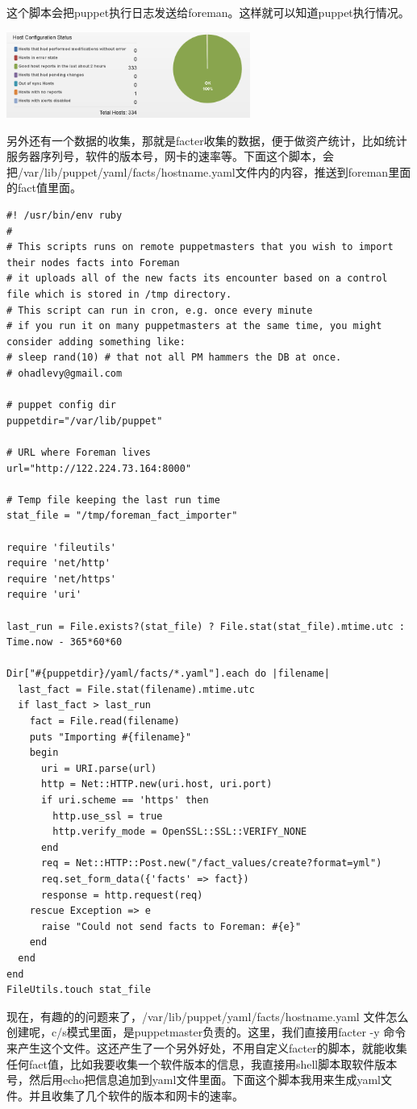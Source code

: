 这个脚本会把puppet执行日志发送给foreman。这样就可以知道puppet执行情况。
\begin{center}
\includegraphics[width=0.6\textwidth]{1.png}
\end{center}
\par
另外还有一个数据的收集，那就是facter收集的数据，便于做资产统计，比如统计服务器序列号，软件的版本号，网卡的速率等。下面这个脚本，会把/var/lib/puppet/yaml/facts/hostname.yaml文件内的内容，推送到foreman里面的fact值里面。
\codefont\tiny \begin{lstlisting}
#! /usr/bin/env ruby
#
# This scripts runs on remote puppetmasters that you wish to import their nodes facts into Foreman
# it uploads all of the new facts its encounter based on a control file which is stored in /tmp directory.
# This script can run in cron, e.g. once every minute
# if you run it on many puppetmasters at the same time, you might consider adding something like:
# sleep rand(10) # that not all PM hammers the DB at once.
# ohadlevy@gmail.com

# puppet config dir
puppetdir="/var/lib/puppet"

# URL where Foreman lives
url="http://122.224.73.164:8000"

# Temp file keeping the last run time
stat_file = "/tmp/foreman_fact_importer"

require 'fileutils'
require 'net/http'
require 'net/https'
require 'uri'

last_run = File.exists?(stat_file) ? File.stat(stat_file).mtime.utc : Time.now - 365*60*60

Dir["#{puppetdir}/yaml/facts/*.yaml"].each do |filename|
  last_fact = File.stat(filename).mtime.utc
  if last_fact > last_run
    fact = File.read(filename)
    puts "Importing #{filename}"
    begin
      uri = URI.parse(url)
      http = Net::HTTP.new(uri.host, uri.port)
      if uri.scheme == 'https' then
        http.use_ssl = true
        http.verify_mode = OpenSSL::SSL::VERIFY_NONE
      end
      req = Net::HTTP::Post.new("/fact_values/create?format=yml")
      req.set_form_data({'facts' => fact})
      response = http.request(req)
    rescue Exception => e
      raise "Could not send facts to Foreman: #{e}"
    end
  end
end
FileUtils.touch stat_file

\end{lstlisting}
\fzsk\normalsize
现在，有趣的的问题来了，/var/lib/puppet/yaml/facts/hostname.yaml 文件怎么创建呢，c/s模式里面，是puppetmaster负责的。这里，我们直接用facter  -y 命令来产生这个文件。这还产生了一个另外好处，不用自定义facter的脚本，就能收集任何fact值，比如我要收集一个软件版本的信息，我直接用shell脚本取软件版本号，然后用echo把信息追加到yaml文件里面。下面这个脚本我用来生成yaml文件。并且收集了几个软件的版本和网卡的速率。

